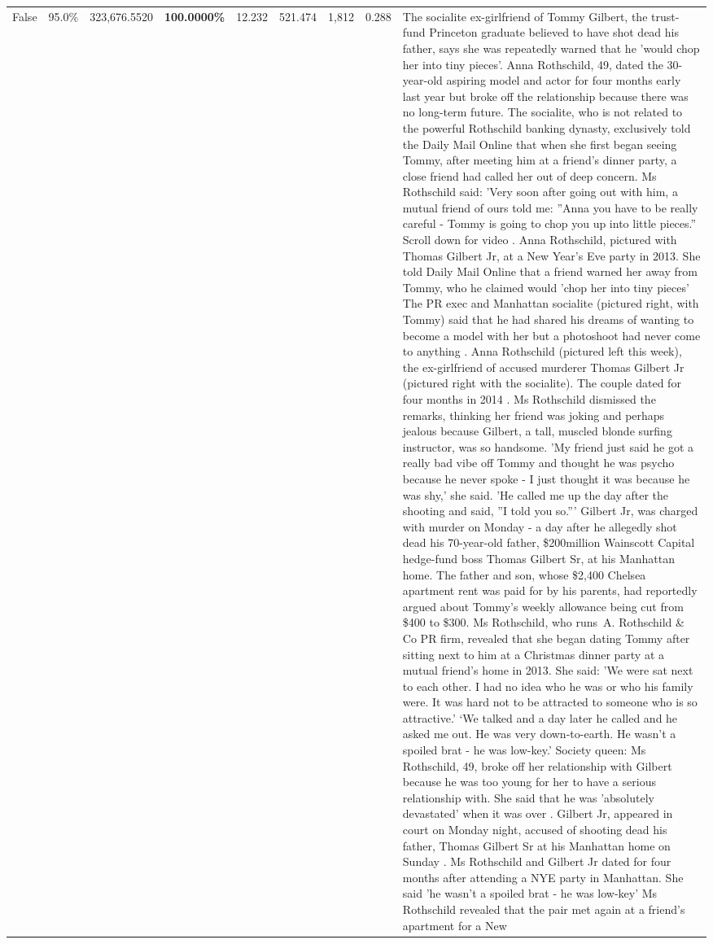\begin{table}[H]
\begin{tabular}{lllrlllll}
False & 95.0\% & 323,676.5520 & \bfseries \color{red} 100.0000\% & 12.232 & 521.474 & 1,812 & 0.288 & The socialite ex-girlfriend of Tommy Gilbert, the trust-fund Princeton graduate believed to have shot dead his father, says she was repeatedly warned that he 'would chop her into tiny pieces'. Anna Rothschild, 49, dated the 30-year-old aspiring model and actor for four months early last year but broke off the relationship because there was no long-term future. The socialite, who is not related to the powerful Rothschild banking dynasty, exclusively told the Daily Mail Online that when she first began seeing Tommy, after meeting him at a friend's dinner party, a close friend had called her out of deep concern. Ms Rothschild said: 'Very soon after going out with him, a mutual friend of ours told me: ''Anna you have to be really careful - Tommy is going to chop you up into little pieces.'' Scroll down for video . Anna Rothschild, pictured with Thomas Gilbert Jr, at a New Year's Eve party in 2013. She told Daily Mail Online that a friend warned her away from Tommy, who he claimed would 'chop her into tiny pieces' The PR exec and Manhattan socialite (pictured right, with Tommy) said that he had shared his dreams of wanting to become a model with her but a photoshoot had never come to anything . Anna Rothschild (pictured left this week), the ex-girlfriend of accused murderer Thomas Gilbert Jr (pictured right with the socialite). The couple dated for four months in 2014 . Ms Rothschild dismissed the remarks, thinking her friend was joking and perhaps jealous because Gilbert, a tall, muscled blonde surfing instructor, was so handsome. 'My friend just said he got a really bad vibe off Tommy and thought he was psycho because he never spoke - I just thought it was because he was shy,' she said. 'He called me up the day after the shooting and said, ''I told you so.''' Gilbert Jr, was charged with murder on Monday - a day after he allegedly shot dead his 70-year-old father, \$200million Wainscott Capital hedge-fund boss Thomas Gilbert Sr, at his Manhattan home. The father and son, whose \$2,400 Chelsea apartment rent was paid for by his parents, had reportedly argued about Tommy's weekly allowance being cut from \$400 to \$300. Ms Rothschild, who runs A. Rothschild \& Co PR firm, revealed that she began dating Tommy after sitting next to him at a Christmas dinner party at a mutual friend's home in 2013. She said: 'We were sat next to each other. I had no idea who he was or who his family were. It was hard not to be attracted to someone who is so attractive.' ‘We talked and a day later he called and he asked me out. He was very down-to-earth. He wasn’t a spoiled brat - he was low-key.’ Society queen: Ms Rothschild, 49, broke off her relationship with Gilbert because he was too young for her to have a serious relationship with. She said that he was 'absolutely devastated' when it was over . Gilbert Jr, appeared in court on Monday night, accused of shooting dead his father, Thomas Gilbert Sr at his Manhattan home on Sunday . Ms Rothschild and Gilbert Jr dated for four months after attending a NYE party in Manhattan. She said 'he wasn't a spoiled brat - he was low-key' Ms Rothschild revealed that the pair met again at a friend’s apartment for a New 
\end{tabular}
\end{table}
